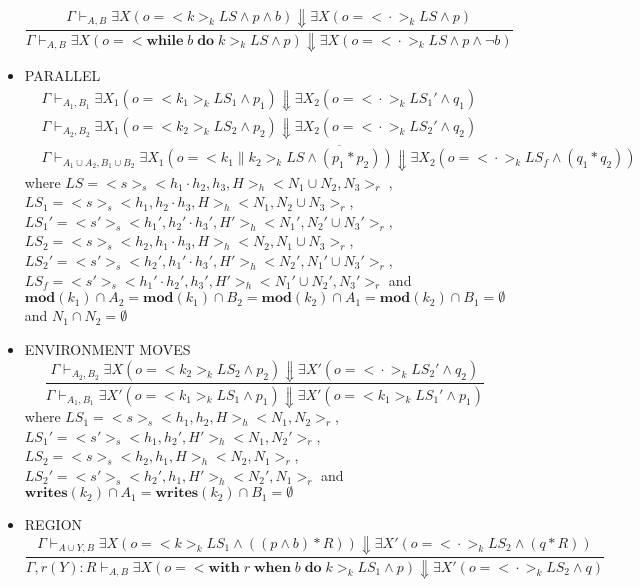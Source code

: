 \documentclass{lmcs} %
\theoremstyle{plain}\newtheorem{satz}[thm]{Satz} %
\begin{document}
\begin{itemize}
$$\dfrac{\Gamma \vdash_{A,B} \exists X(o=<\!\!k\!\!>_k LS\land p \land b)\Downarrow \exists X(o=<\!\!\cdot\!\!>_k LS\land p)}{\Gamma \vdash_{A,B} \exists X(o=<\!\!\mathbf{while}\;b\;\mathbf{do}\;k\!\!>_k LS\land p)\Downarrow \exists X(o=<\!\!\cdot\!\!>_k LS\land p\land \neg b)}$$
\item PARALLEL
\begin{align*}
   &\Gamma \vdash_{A_1,B_1} \exists X_1(o=<\!\!k_1\!\!>_k LS_1\land p_1)\Downarrow\exists X_2(o=<\!\!\cdot\!\!>_k LS_1'\land q_1)\\
   &\Gamma \vdash_{A_2,B_2} \exists X_1(o=<\!\!k_2\!\!>_k LS_2\land p_2)\Downarrow\exists X_2(o=<\!\!\cdot\!\!>_k LS_2'\land q_2)\\
   &\overline{\Gamma \vdash_{A_1\cup A_2,B_1\cup B_2} \exists X_1 (o=<\!\!k_1 \parallel k_2\!\!>_k LS\land (p_1*p_2))\Downarrow\exists X_2 (o=<\!\!\cdot\!\!>_k LS_f\land (q_1* q_2))}
\end{align*}
where $LS=<\!\!s\!\!>_s<\!\!h_1\cdot h_2, h_3,H\!\!>_h<\!\!N_1\cup N_2, N_3\!\!>_r$ ,$LS_1=<\!\!s\!\!>_s<\!\!h_1,h_2\cdot h_3,H\!\!>_h<\!\!N_1,N_2\cup N_3\!\!>_r$, $LS_1'=<\!\!s'\!\!>_s<\!\!h_1',h_2'\cdot h_3',H'\!\!>_h<\!\!N_1',N_2'\cup N_3'\!\!>_r$, $LS_2=<\!\!s\!\!>_s<\!\!h_2,h_1\cdot h_3,H\!\!>_h<\!\!N_2,N_1\cup N_3\!\!>_r$,$LS_2'=<\!\!s'\!\!>_s<\!\!h_2',h_1'\cdot h_3',H'\!\!>_h<\!\!N_2',N_1'\cup N_3'\!\!>_r$,
$LS_f=<\!\!s'\!\!>_s<\!\!h_1'\cdot h_2',h_3',H'\!\!>_h<\!\!N_1'\cup N_2',N_3'\!\!>_r$
and $\mathbf{mod}(k_1) \cap A_2=\mathbf{mod}(k_1) \cap B_2=\mathbf{mod}(k_2) \cap A_1 =\mathbf{mod}(k_2) \cap B_1 = \emptyset$ and $N_1\cap N_2=\emptyset$
\item ENVIRONMENT MOVES
$$\dfrac{\Gamma \vdash_{A_2,B_2} \exists X(o=<\!\!k_2\!\!>_k LS_2\land p_2)\Downarrow \exists X'(o=<\!\!\cdot\!\!>_k LS_2'\land q_2)}{\Gamma \vdash_{A_1,B_1} \exists X'(o=<\!\!k_1\!\!>_k LS_1\land p_1)\Downarrow \exists X'(o=<\!\!k_1\!\!>_k LS_1'\land p_1)}$$
where $LS_1=<\!\!s\!\!>_s<\!\!h_1,h_2,H\!\!>_h<\!\!N_1,N_2\!\!>_r$, $LS_1'=<\!\!s'\!\!>_s<\!\!h_1,h_2',H'\!\!>_h<\!\!N_1,N_2'\!\!>_r$, $LS_2=<\!\!s\!\!>_s<\!\!h_2,h_1,H\!\!>_h<\!\!N_2,N_1\!\!>_r$,$LS_2'=<\!\!s'\!\!>_s<\!\!h_2',h_1,H'\!\!>_h<\!\!N_2',N_1\!\!>_r$
and $\mathbf{writes}(k_2) \cap A_1 =\mathbf{writes}(k_2) \cap B_1 = \emptyset$
\item REGION
$$\dfrac{\Gamma \vdash_{A\cup Y,B} \exists X(o=<\!\!k\!\!>_k LS_1\land(( p \land b)*R))\Downarrow \exists X'(o=<\!\!\cdot\!\!>_k LS_2\land (q*R))}{\Gamma,r(Y):R \vdash_{A,B} \exists X(o=<\!\!\mathbf{with}\;r\;\mathbf{when}\;b\;\mathbf{do}\;k\!\!>_k LS_1\land p)\Downarrow \exists X'(o=<\!\!\cdot\!\!>_k LS_2\land q)}$$

\end{itemize}
\end{document}
